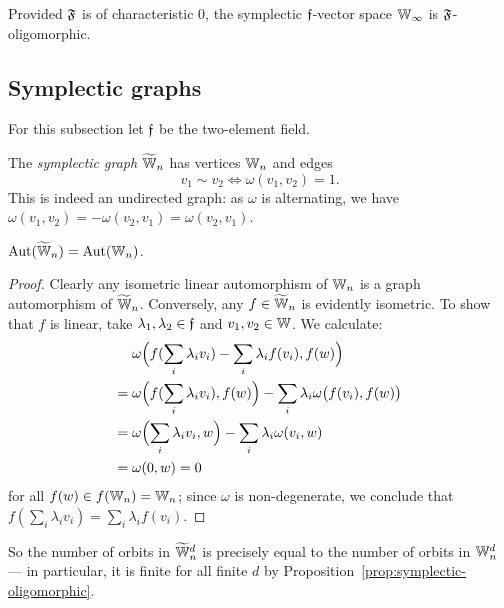 \begin{corollary}
    Provided $\mathfrak{F}$ is of characteristic $0$, the symplectic $\mathfrak{f}$-vector space $\mathbb{W}_\infty$ is $\mathfrak{F}$-oligomorphic.
\end{corollary}




\subsection{Symplectic graphs}
For this subsection let $\mathfrak{f}$ be the two-element field.
\begin{definition}
    The \emph{symplectic graph} $\widetilde {\mathbb{W}}_n$ has vertices $\mathbb{W}_n$ and edges
    \[
        v_1 \sim v_2 \iff \omega(v_1, v_2) = 1.
    \]
    This is indeed an undirected graph: as $\omega$ is alternating, we have $\omega(v_1, v_2) = -\omega(v_2, v_1) = \omega(v_2, v_1)$.    
\end{definition}

\begin{proposition}\label{prop:symplectic-vs-graph}
    $\operatorname{Aut}(\widetilde {\mathbb{W}}_n) = \operatorname{Aut}(\mathbb{W}_n)$.
\end{proposition}
\begin{proof}
    Clearly any isometric linear automorphism of $\mathbb{W}_n$ is a graph automorphism of $\widetilde {\mathbb{W}}_n$.
    Conversely, any $f \in \widetilde {\mathbb{W}}_n$ is evidently isometric.
    To show that $f$ is linear, take $\lambda_1, \lambda_2 \in \mathfrak{f}$ and $v_1, v_2 \in \mathbb{W}$.
    We calculate:
    \begin{align*}
        &\omega\Bigl( f(\sum_i \lambda_i v_i) - \sum_i \lambda_i f(v_i) , f(w) \Bigr) \\
        ={}& \omega\Bigl( f(\sum_i \lambda_i v_i), f(w)\Bigr) - \sum_i \lambda_i \omega\bigl(f(v_i), f(w) \bigr) \\
        ={}& \omega\Bigl( \sum_i \lambda_i v_i, w \Bigr) - \sum_i \lambda_i \omega( v_i, w ) \\
        ={}& \omega(0, w) = 0
    \end{align*}
    for all $f(w) \in f(\mathbb{W}_n) = \mathbb{W}_n$;
    since $\omega$ is non-degenerate, 
    we conclude that $f(\sum_i \lambda_i v_i) = \sum_i \lambda_i f(v_i)$.
\end{proof}

So the number of orbits in $\widetilde {\mathbb{W}}_n^d$ is precisely equal to the number of orbits in $\mathbb{W}_n^d$
--- in particular, it is finite for all finite $d$ by Proposition~\ref{prop:symplectic-oligomorphic}.

